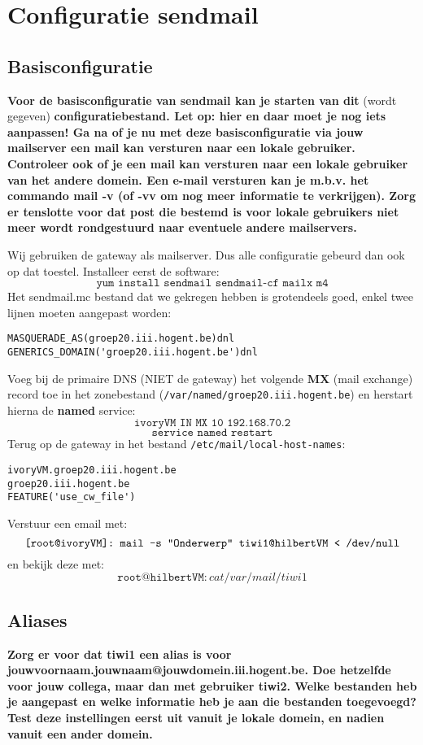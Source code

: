\documentclass{report}
\begin{document}
\section{Configuratie sendmail}
\subsection{Basisconfiguratie}
\textbf{Voor de basisconfiguratie van sendmail kan je starten van dit} (wordt gegeven) \textbf{ configuratiebestand.
Let op: hier en daar moet je nog iets aanpassen! Ga na of je nu met deze basisconfiguratie via jouw mailserver een mail kan versturen naar een lokale gebruiker.
Controleer ook of je een mail kan versturen naar een lokale gebruiker van het andere domein.
Een e-mail versturen kan je m.b.v. het commando mail -v (of -vv om nog meer informatie te verkrijgen). Zorg er tenslotte voor dat post die bestemd is voor lokale gebruikers niet meer wordt rondgestuurd naar eventuele andere mailservers.}

Wij gebruiken de gateway als mailserver. Dus alle configuratie gebeurd dan ook op dat toestel. Installeer eerst de software:
$$\texttt{yum install sendmail sendmail-cf mailx m4}$$
Het sendmail.mc bestand dat we gekregen hebben is grotendeels goed, enkel twee lijnen moeten aangepast worden:
\begin{lstlisting}
MASQUERADE_AS(groep20.iii.hogent.be)dnl
GENERICS_DOMAIN('groep20.iii.hogent.be')dnl
\end{lstlisting}


Voeg bij de primaire DNS (NIET de gateway) het volgende \textbf{MX} (mail exchange) record toe in het zonebestand (\texttt{/var/named/groep20.iii.hogent.be}) en herstart hierna de \textbf{named} service:
$$\texttt{ivoryVM IN MX 10 192.168.70.2}$$
$$\texttt{service named restart}$$
Terug op de gateway in het bestand \texttt{/etc/mail/local-host-names}:
\begin{lstlisting}
ivoryVM.groep20.iii.hogent.be
groep20.iii.hogent.be
FEATURE('use_cw_file')
\end{lstlisting}
Verstuur een email met:
$$\texttt{[root@ivoryVM]: mail -s "Onderwerp"\space tiwi1@hilbertVM < /dev/null}$$
en bekijk deze met:
$$\texttt{root@hilbertVM}: cat /var/mail/tiwi1$$

\subsection{Aliases}
\textbf{Zorg er voor dat tiwi1 een alias is voor jouwvoornaam.jouwnaam@jouwdomein.iii.hogent.be.
 Doe hetzelfde voor jouw collega, maar dan met gebruiker tiwi2. Welke bestanden heb je aangepast en welke informatie heb je aan die bestanden toegevoegd? 
 Test deze instellingen eerst uit vanuit je lokale domein, en nadien vanuit een ander domein.}
\end{document}
